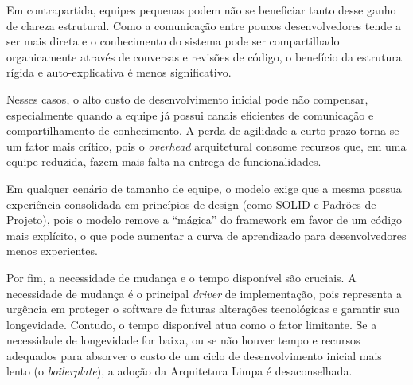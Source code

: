     \par Em contrapartida, equipes pequenas podem não se beneficiar tanto desse ganho de clareza estrutural. Como a comunicação entre poucos desenvolvedores tende a ser mais direta e o conhecimento do sistema pode ser compartilhado organicamente através de conversas e revisões de código, o benefício da estrutura rígida e auto-explicativa é menos significativo. 
    
    \par Nesses casos, o alto custo de desenvolvimento inicial pode não compensar, especialmente quando a equipe já possui canais eficientes de comunicação e compartilhamento de conhecimento. A perda de agilidade a curto prazo torna-se um fator mais crítico, pois o \textit{overhead} arquitetural consome recursos que, em uma equipe reduzida, fazem mais falta na entrega de funcionalidades.

    \par Em qualquer cenário de tamanho de equipe, o modelo exige que a mesma possua experiência consolidada em princípios de design (como SOLID e Padrões de Projeto), pois o modelo remove a “mágica” do framework em favor de um código mais explícito, o que pode aumentar a curva de aprendizado para desenvolvedores menos experientes.
    
    \par Por fim, a necessidade de mudança e o tempo disponível são cruciais. A necessidade de mudança é o principal \textit{driver} de implementação, pois representa a urgência em proteger o software de futuras alterações tecnológicas e garantir sua longevidade. Contudo, o tempo disponível atua como o fator limitante. Se a necessidade de longevidade for baixa, ou se não houver tempo e recursos adequados para absorver o custo de um ciclo de desenvolvimento inicial mais lento (o \textit{boilerplate}), a adoção da Arquitetura Limpa é desaconselhada.